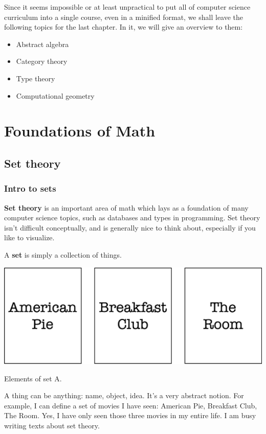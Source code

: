 \documentclass[12pt, a4paper, justified, notitlepage, sfsidenotes, notoc]{book}
\begin{document}
Since it seems impossible or at least unpractical to put all of computer science curriculum into a single course, even in a minified format, we shall leave the following topics for the last chapter. In it, we will give an overview to them:

\begin{itemize}
\item Abstract algebra
\item Category theory
\item Type theory
\item Computational geometry
\end{itemize}

\part{Foundations of Math}
\label{sec:org1376ee1}
\chapter{Set theory}
\label{sec:org0e2ae1c}

\section{Intro to sets}
\label{sec:org1212f31}

\textbf{\textbf{Set theory}} is an important area of math which lays as a foundation of many computer science topics, such as databases and types in programming. Set theory isn't difficult conceptually, and is generally nice to think about, especially if you like to visualize.

A \textbf{\textbf{set}} is simply a collection of things.

\begin{marginfigure}
  \includegraphics[width=\linewidth]{images/set_movies.png}
  \caption{Elements of set A.}
  \label{fig:marginfig}
\end{marginfigure}

A thing can be anything: name, object, idea. It's a very abstract notion. For example, I can define a set of movies I have seen: American Pie, Breakfast Club, The Room. Yes, I have only seen those three movies in my entire life. I am busy writing texts about set theory.
\end{document}

